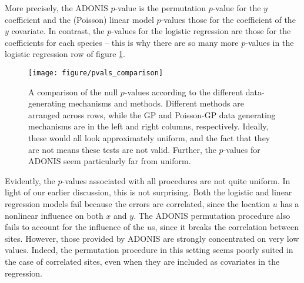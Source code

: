 \documentclass{article}
\begin{document}
More precisely, the ADONIS $p$-value is the permutation $p$-value for the $y$
coefficient and the (Poisson) linear model $p$-values those for the coefficient
of the $y$ covariate. In contrast, the $p$-values for the logistic regression
are those for the coefficients for each species -- this is why there are so many
more $p$-values in the logistic regression row of figure
\ref{fig:pvals_comparison}.

\begin{figure}
  \centering
  \texttt{[image: figure/pvals\_comparison]}
  \caption{\label{fig:pvals_comparison} A comparison of the null $p$-values
    according to the different data-generating mechanisms and methods. Different
    methods are arranged across rows, while the GP and Poisson-GP data
    generating mechanisms are in the left and right columns, respectively.
    Ideally, these would all look approximately uniform, and the fact that they
    are not means these tests are not valid. Further, the $p$-values for ADONIS
    seem particularly far from uniform.
  }
\end{figure}

Evidently, the $p$-values associated with all procedures are not quite uniform.
In light of our earlier discussion, this is not surprising. Both the logistic
and linear regression models fail because the errors are correlated, since the
location $u$ has a nonlinear influence on both $x$ and $y$. The ADONIS
permutation procedure also fails to account for the influence of the $u$s, since
it breaks the correlation between sites. However, those provided by ADONIS are
strongly concentrated on very low values. Indeed, the permutation procedure in
this setting seems poorly suited in the case of correlated sites, even when they
are included as covariates in the regression.



\end{document}
